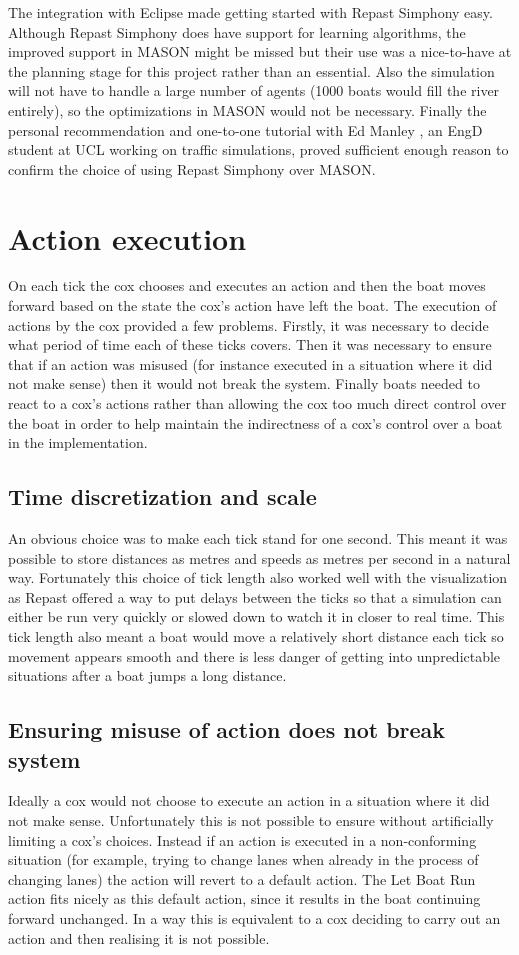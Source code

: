     The integration with Eclipse made getting started with Repast Simphony easy. Although Repast Simphony does have support for learning algorithms, the improved support in MASON might be missed but their use was a nice-to-have at the planning stage for this project rather than an essential. Also the simulation will not have to handle a large number of agents (1000 boats would fill the river entirely), so the optimizations in MASON would not be necessary. Finally the personal recommendation and one-to-one tutorial with Ed Manley \cite{Manley2012}, an EngD student at UCL working on traffic simulations, proved sufficient enough reason to confirm the choice of using Repast Simphony over MASON.
  
  \section{Action execution}
    On each tick the cox chooses and executes an action and then the boat moves forward based on the state the cox's action have left the boat. The execution of actions by the cox provided a few problems. Firstly, it was  necessary to decide what period of time each of these ticks covers. Then it was necessary to ensure that if an action was misused (for instance executed in a situation where it did not make sense) then it would not break the system. Finally boats needed to react to a cox's actions rather than allowing the cox too much direct control over the boat in order to help maintain the indirectness of a cox's control over a boat in the implementation.
    
    \subsection{Time discretization and scale}
    An obvious choice was to make each tick stand for one second. This meant it was possible to store distances as metres and speeds as metres per second in a natural way. Fortunately this choice of tick length also worked well with the visualization as Repast offered a way to put delays between the ticks so that a simulation can either be run very quickly or slowed down to watch it in closer to real time. This tick length also meant a boat would move a relatively short distance each tick so movement appears smooth and there is less danger of getting into unpredictable situations after a boat jumps a long distance.
    
    \subsection{Ensuring misuse of action does not break system}
      Ideally a cox would not choose to execute an action in a situation where it did not make sense. Unfortunately this is not possible to ensure without artificially limiting a cox's choices. Instead if an action is executed in a non-conforming situation (for example, trying to change lanes when already in the process of changing lanes) the action will revert to a default action. The Let Boat Run action fits nicely as this default action, since it results in the boat continuing forward unchanged. In a way this is equivalent to a cox deciding to carry out an action and then realising it is not possible.

